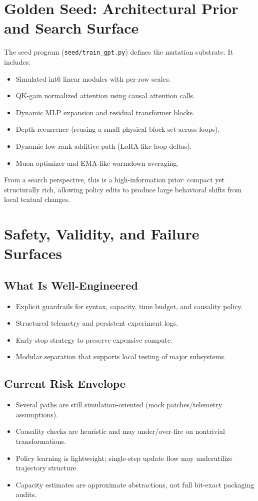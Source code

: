 \documentclass[11pt]{article}
\begin{document}
\section{Golden Seed: Architectural Prior and Search Surface}
The seed program (\texttt{seed/train\_gpt.py}) defines the mutation substrate. It includes:
\begin{itemize}[leftmargin=1.5em]
    \item Simulated int6 linear modules with per-row scales.
    \item QK-gain normalized attention using causal attention calls.
    \item Dynamic MLP expansion and residual transformer blocks.
    \item Depth recurrence (reusing a small physical block set across loops).
    \item Dynamic low-rank additive path ($\text{LoRA-like}$ loop deltas).
    \item Muon optimizer and EMA-like warmdown averaging.
\end{itemize}

From a search perspective, this is a high-information prior: compact yet structurally rich, allowing policy edits to produce large behavioral shifts from local textual changes.

\section{Safety, Validity, and Failure Surfaces}
\subsection{What Is Well-Engineered}
\begin{itemize}[leftmargin=1.5em]
    \item Explicit guardrails for syntax, capacity, time budget, and causality policy.
    \item Structured telemetry and persistent experiment logs.
    \item Early-stop strategy to preserve expensive compute.
    \item Modular separation that supports local testing of major subsystems.
\end{itemize}

\subsection{Current Risk Envelope}
\begin{itemize}[leftmargin=1.5em]
    \item Several paths are still simulation-oriented (mock patches/telemetry assumptions).
    \item Causality checks are heuristic and may under/over-fire on nontrivial transformations.
    \item Policy learning is lightweight; single-step update flow may underutilize trajectory structure.
    \item Capacity estimates are approximate abstractions, not full bit-exact packaging audits.
\end{itemize}
\end{document}
